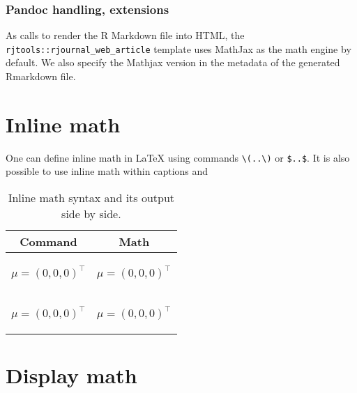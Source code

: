 \subsubsection{Pandoc handling, extensions}
As  calls  to render the R Markdown file into HTML,
the \verb|rjtools::rjournal_web_article| template uses MathJax as the math engine by default. 
We also specify the Mathjax version in the metadata of the generated Rmarkdown file.

\section{Inline math}
One can define inline math in LaTeX using commands \verb|\(..\)| or \verb|$..$|.
It is also possible to use inline math within captions and  
\begin{table}[htbp]
  \centering
  \begin{tabular}{| c | c |}
  \hline
  Command & Math\\
    \hline
    \begin{minipage}{0.45\textwidth}
\vspace{1mm}
\begin{example}
\(\mu = (0,0,0)^\top \)
\end{example}
    \end{minipage} &
    \begin{minipage}{0.45\textwidth}
    \centering
    \( \mu = (0,0,0)^\top \)
    \end{minipage}\\
    \hline
    
  \begin{minipage}{0.45\textwidth}
\vspace{1mm}
\begin{example}
$\mu = (0,0,0)^\top $
\end{example}
    \end{minipage} &
    \begin{minipage}{0.45\textwidth}
    \centering
    $ \mu = (0,0,0)^\top $
    \end{minipage}\\
    \hline
  \end{tabular}
  \caption{Inline math syntax and its output side by side.}
  \label{table:1}
\end{table}



\section{Display math}

